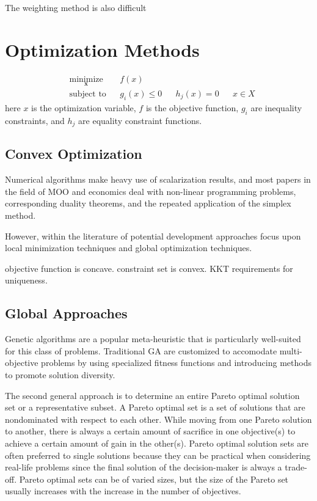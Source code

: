 The weighting method is also difficult

\section{Optimization Methods}

\begin{equation}
  \begin{aligned}
  & \underset{\bm{x}}{\text{minimize}}
        & &  f(x)\\
  & \text{subject to}
        & & g_i(x) \leq 0
        & & h_j(x) = 0
        & & x \in X
  \end{aligned}
\end{equation}
here $x$ is the optimization variable, $f$ is the objective function, $g_i$ are inequality constraints, and $h_j$ are equality constraint functions.

\subsection{Convex Optimization}
Numerical algorithms make heavy use of scalarization results, and most papers in the field of MOO and economics deal with non-linear programming problems, corresponding duality theorems, and the repeated application of the simplex method.

However, within the literature of potential development approaches focus upon local minimization techniques and global optimization techniques.

objective function is concave.  constraint set is convex.  KKT requirements for uniqueness.

\subsection{Global Approaches}

Genetic algorithms are a popular meta-heuristic that is particularly well-suited for this class of problems.  Traditional GA are customized to accomodate multi-objective problems by using specialized fitness functions and introducing methods to promote solution diversity.

The second general approach is to determine an entire Pareto optimal solution set or a representative subset. A Pareto optimal set is a set of solutions that are nondominated with respect to each other. While moving from one Pareto solution to another, there is always a certain amount of sacrifice in one objective(s) to achieve a certain amount of gain in the other(s). Pareto optimal solution sets are often preferred to single solutions because they can be practical when considering real-life problems since the final solution of the decision-maker is always a trade-off. Pareto optimal sets can be of varied sizes, but the size of the Pareto set usually increases with the increase in the number of objectives.

